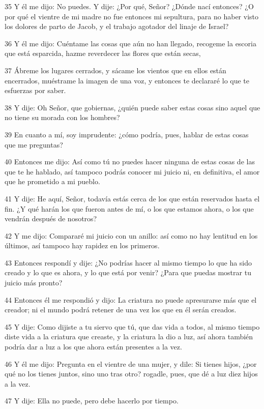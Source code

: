 \par 35 Y él me dijo: No puedes. Y dije: ¿Por qué, Señor? ¿Dónde nací entonces? ¿O por qué el vientre de mi madre no fue entonces mi sepultura, para no haber visto los dolores de parto de Jacob, y el trabajo agotador del linaje de Israel?
\par 36 Y él me dijo: Cuéntame las cosas que aún no han llegado, recogeme la escoria que está esparcida, hazme reverdecer las flores que están secas,
\par 37 Ábreme los lugares cerrados, y sácame los vientos que en ellos están encerrados, muéstrame la imagen de una voz, y entonces te declararé lo que te esfuerzas por saber.
\par 38 Y dije: Oh Señor, que gobiernas, ¿quién puede saber estas cosas sino aquel que no tiene su morada con los hombres?
\par 39 En cuanto a mí, soy imprudente: ¿cómo podría, pues, hablar de estas cosas que me preguntas?
\par 40 Entonces me dijo: Así como tú no puedes hacer ninguna de estas cosas de las que te he hablado, así tampoco podrás conocer mi juicio ni, en definitiva, el amor que he prometido a mi pueblo.
\par 41 Y dije: He aquí, Señor, todavía estás cerca de los que están reservados hasta el fin. ¿Y qué harán los que fueron antes de mí, o los que estamos ahora, o los que vendrán después de nosotros?
\par 42 Y me dijo: Compararé mi juicio con un anillo: así como no hay lentitud en los últimos, así tampoco hay rapidez en los primeros.
\par 43 Entonces respondí y dije: ¿No podrías hacer al mismo tiempo lo que ha sido creado y lo que es ahora, y lo que está por venir? ¿Para que puedas mostrar tu juicio más pronto?
\par 44 Entonces él me respondió y dijo: La criatura no puede apresurarse más que el creador; ni el mundo podrá retener de una vez los que en él serán creados.
\par 45 Y dije: Como dijiste a tu siervo que tú, que das vida a todos, al mismo tiempo diste vida a la criatura que creaste, y la criatura la dio a luz, así ahora también podría dar a luz a los que ahora están presentes a la vez.
\par 46 Y él me dijo: Pregunta en el vientre de una mujer, y dile: Si tienes hijos, ¿por qué no los tienes juntos, sino uno tras otro? rogadle, pues, que dé a luz diez hijos a la vez.
\par 47 Y dije: Ella no puede, pero debe hacerlo por tiempo.
